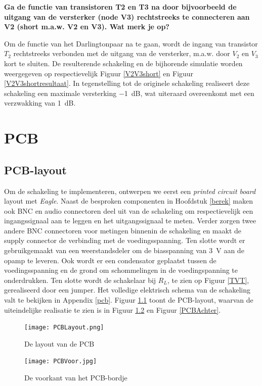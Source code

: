 \documentclass{report}
\begin{document}
\noindent \textbf{Ga de functie van transistoren T2 en T3 na door bijvoorbeeld de uitgang van de versterker
(node V3) rechtstreeks te connecteren aan V2 (short m.a.w. V2 en V3). Wat merk je op?}


\noindent Om de functie van het Darlingtonpaar na te gaan, wordt de ingang van transistor $T_2$ rechtstreeks verbonden met de uitgang van de versterker, m.a.w. door $V_{2}$ en $V_3$ kort te sluiten. De resulterende schakeling en de bijhorende simulatie worden weergegeven op respectievelijk Figuur \ref{V2V3short} en Figuur \ref{V2V3shortresultaat}. In tegenstelling tot de originele schakeling realiseert deze schakeling een maximale versterking \SI{-1}{\deci\bel}, wat uiteraard overeenkomt met een verzwakking van \SI{1}{\deci\bel}.

\chapter{PCB}
\section{PCB-layout}
Om de schakeling te implementeren, ontwerpen we eerst een \textit{printed circuit board} layout met \textit{Eagle}. Naast de besproken componenten in Hoofdstuk \ref{berek} maken ook
BNC en audio connectoren deel uit van de schakeling om respectievelijk een ingangssignaal aan te leggen en het uitgangssignaal te meten. Verder zorgen twee andere BNC connectoren voor metingen binnenin de schakeling en maakt de supply connector de verbinding met de voedingsspanning. Ten slotte wordt er gebruikgemaakt van een weerstandsdeler om de biasspanning van \SI{3}{\volt} aan de opamp te leveren. Ook wordt er een condensator geplaatst tussen de voedingsspanning en de grond om schommelingen in de voedingspanning te onderdrukken. Ten slotte wordt de schakelaar bij $R_L$, te zien op Figuur \ref{TVT}, gerealiseerd door een jumper. Het volledige elektrisch schema van de schakeling valt te bekijken in Appendix \ref{pcb}.
Figuur \ref{PCBLayout} toont de PCB-layout, waarvan de uiteindelijke realisatie te zien is in Figuur \ref{PCBVoor} en Figuur \ref{PCBAchter}.

\begin{figure}[H]
	\centering
	\texttt{[image: PCBLayout.png]}
	\caption{De layout van de PCB}
	\label{PCBLayout}
\end{figure}

\begin{figure}[H]
	\centering
	\texttt{[image: PCBVoor.jpg]}
	\caption{De voorkant van het PCB-bordje}
	\label{PCBVoor}
\end{figure}
\end{document}
